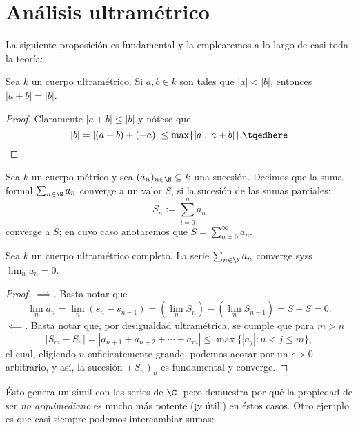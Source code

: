 \documentclass[teoria-numeros.tex]{subfiles}
\begin{document}
\section{Análisis ultramétrico}
La siguiente proposición es fundamental y la emplearemos a lo largo de casi toda la teoría:
\begin{prop}\label{thm:bigger_wins}
	Sea $k$ un cuerpo ultramétrico.
	Si $a, b\in k$ son tales que $|a| < |b|$, entonces $|a + b| = |b|$.
\end{prop}
\begin{proof}
	Claramente $|a + b| \le |b|$ y nótese que
	\begin{equation}
		|b| = |(a + b) + (-a)| \le \max\{ |a|, |a + b| \}.
		\tqedhere
	\end{equation}
\end{proof}

\begin{mydef}
	Sea $k$ un cuerpo métrico y sea $(a_n)_{n\in\N} \subseteq k$ una sucesión. Decimos que la suma formal $\sum_{n\in\N} a_n$ converge a un valor $S$,
	si la sucesión de las sumas parciales:
	$$ S_n := \sum_{i=0}^{n} a_n $$
	converge a $S$; en cuyo caso anotaremos que $S = \sum_{n=0}^{\infty} a_n$.
\end{mydef}

\begin{prop}\label{thm:series_convergence_ultrametric}
	Sea $k$ un cuerpo ultramétrico completo. La serie $\sum_{n\in\N} a_n$ converge syss $\lim_n a_n = 0$.
\end{prop}
\begin{proof}
	$\implies$. Basta notar que
	$$ \lim_n a_n = \lim_n (s_n - s_{n-1}) = {\textstyle (\lim_n S_n) - (\lim_n S_{n-1}) } = S - S = 0. $$
	$\impliedby$. Basta notar que, por desigualdad ultramétrica, se cumple que para $m > n$
	$$ |S_m - S_n| = |a_{n+1} + a_{n+2} + \cdots + a_m| \le \max\{|a_j| : n < j \le m\}, $$
	el cual, eligiendo $n$ suficientemente grande, podemos acotar por un $\epsilon > 0$ arbitrario, y así, la sucesión $(S_n)_n$ es fundamental y converge.
\end{proof}
Ésto genera un símil con las series de $\C$, pero demuestra por qué la propiedad de ser \textit{no arquimediano} es mucho más potente (¡y útil!) en éstos casos.
Otro ejemplo es que casi siempre podemos intercambiar sumas:
\end{document}
